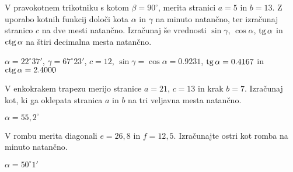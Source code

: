 \begin{vaja}
V pravokotnem trikotniku s kotom $\beta= 90^{\circ}$, merita stranici $a=5$ in $b=13$. Z uporabo kotnih funkcij določi kota $\alpha$ in $\gamma$ na minuto natančno, ter izračunaj stranico $c$ na dve mesti natančno. Izračunaj še vrednosti $\sin\gamma$, $\cos\alpha$, $\operatorname{tg}\alpha$ in $\operatorname{ctg}\alpha$  na štiri decimalna mesta natančno.
	\begin{odgovor}
$\alpha=22^{\circ}37'$, $\gamma=67^{\circ}23'$, $c=12$, $\sin\gamma=\cos\alpha=0.9231$, $\operatorname{tg}\alpha=0.4167$ in $\operatorname{ctg}\alpha=2.4000$
	\end{odgovor}
\end{vaja}

\begin{vaja}
V enkokrakem trapezu merijo stranice $a=21$, $c=13$ in krak $b=7$. Izračunaj kot, ki ga oklepata stranica $a$ in $b$ na tri veljavna mesta natančno.
	\begin{odgovor}
$\alpha=55,2^{\circ}$
	\end{odgovor}
\end{vaja}

\begin{vaja}
V rombu merita diagonali $e=26,8$ in $f=12,5$. Izračunajte ostri kot romba na minuto natančno.
	\begin{odgovor}
$\alpha=50^{\circ}1'$
	\end{odgovor}
\end{vaja}

